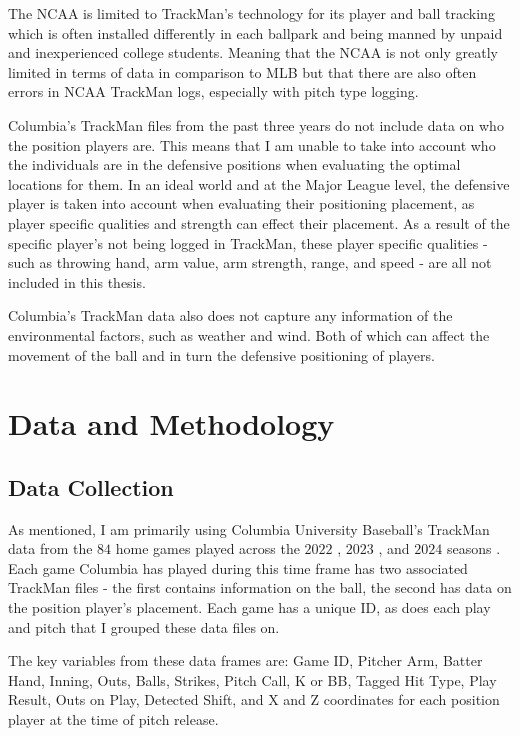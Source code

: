 \documentclass{article}
\begin{document}
The NCAA is limited to TrackMan's technology for its player and ball tracking which is often installed differently in each ballpark and being manned by unpaid and inexperienced college students. Meaning that the NCAA is not only greatly limited in terms of data in comparison to MLB but that there are also often errors in NCAA TrackMan logs, especially with pitch type logging. 

Columbia's TrackMan files from the past three years do not include data on who the position players are. This means that I am unable to take into account who the individuals are in the defensive positions when evaluating the optimal locations for them. In an ideal world and at the Major League level, the defensive player is taken into account when evaluating their positioning placement, as player specific qualities and strength can effect their placement.  As a result of the specific player's not being logged in TrackMan, these player specific qualities - such as throwing hand, arm value, arm strength, range, and speed  - are all not included in this thesis. \cite{mlbsavant2023field} \cite{mlbsavant2023fielderpositioning}

Columbia's TrackMan data also does not capture any information of the environmental factors, such as weather and wind. Both of which can affect the movement of the ball and in turn the defensive positioning of players. \cite{mlb2023windimpact}

\newpage
\section{Data and Methodology}

\subsection{Data Collection}

As mentioned, I am primarily using Columbia University Baseball's TrackMan data from the $84$ home games played across the $2022$ \cite{trackman2022}, $2023$ \cite{trackman2023}, and $2024$ seasons \cite{trackman2024}. Each game Columbia has played during this time frame has two associated TrackMan files - the first contains information on the ball, the second has data on the position player's placement. Each game has a unique ID, as does each play and pitch that I grouped these data files on. 

The key variables from these data frames are: Game ID, Pitcher Arm, Batter Hand, Inning, Outs, Balls, Strikes, Pitch Call, K or BB, Tagged Hit Type, Play Result, Outs on Play, Detected Shift, and X and Z coordinates for each position player at the time of pitch release. 
\end{document}
